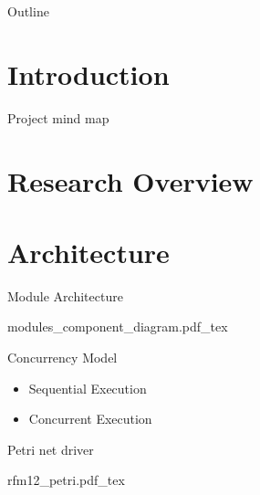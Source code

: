 \begin{frame}
\titlepage
\end{frame}

\begin{frame}{Outline}
\tableofcontents
\end{frame}

\section{Introduction} %
\begin{frame}{Project mind map}
\begin{center}
\scalebox{0.56} {
}
\end{center}
\end{frame}

\section{Research Overview} %

\section{Architecture}
\begin{frame}{Module Architecture}
\begin{center}
\scalebox{0.8} {
    {modules_component_diagram.pdf_tex}
}
\end{center} 
\end{frame}

\begin{frame}{Concurrency Model}
\begin{itemize}
    \item Sequential Execution
    \item Concurrent Execution
\end{itemize} 
\end{frame}

\begin{frame}{Petri net driver}
\begin{center}
\scalebox{0.8} {
    {rfm12_petri.pdf_tex}
}
\end{center}
\end{frame}
